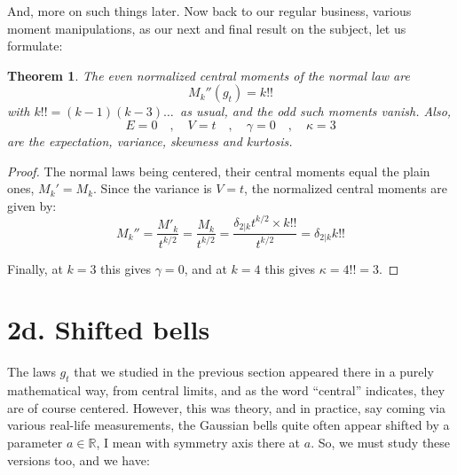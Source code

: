\documentclass[12pt]{amsbook}
\newtheorem{theorem}{Theorem}[chapter]
\begin{document}
And, more on such things later. Now back to our regular business, various moment manipulations, as our next and final result on the subject, let us formulate:

\begin{theorem}
The even normalized central moments of the normal law are
$$M_k''(g_t)=k!!$$
with $k!!=(k-1)(k-3)\ldots\,$ as usual, and the odd such moments vanish. Also,
$$E=0\quad,\quad V=t\quad,\quad \gamma=0\quad,\quad \kappa=3$$
are the expectation, variance, skewness and kurtosis.
\end{theorem}

\begin{proof}
The normal laws being centered, their central moments equal the plain ones, $M_k'=M_k$. Since the variance is $V=t$, the normalized central moments are given by:
$$M_k''=\frac{M'_k}{t^{k/2}}=\frac{M_k}{t^{k/2}}=\frac{\delta_{2|k}t^{k/2}\times k!!}{t^{k/2}}=\delta_{2|k}k!!$$

Finally, at $k=3$ this gives $\gamma=0$, and at $k=4$ this gives $\kappa=4!!=3$.
\end{proof}

\section*{2d. Shifted bells}

The laws $g_t$ that we studied in the previous section appeared there in a purely mathematical way, from central limits, and as the word ``central'' indicates, they are of course centered. However, this was theory, and in practice, say coming via various real-life measurements, the Gaussian bells quite often appear shifted by a parameter $a\in\mathbb R$, I mean with symmetry axis there at $a$. So, we must study these versions too, and we have:

\end{document}
